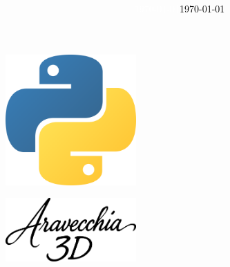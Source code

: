 \documentclass[10pt]{article} %
\date{\small\textcolor{white}\today} %
\title{
	\huge{
		\vspace*{-15mm}
		\resizebox{120mm}{16mm}{\color{black}{\textbf{Python}}} %
	}
}
\begin{document}
	\color{black} %
	\pagecolor{white} %
	\maketitle %
	
	\vspace{-25mm} %
	
	\begin{center}
		\resizebox{120mm}{5mm}{\color{black}{CHEATSHEET}} %
		
		\vspace{10mm}
		\includegraphics[width=50mm]{./IMG/python.png} %
		
		\vspace{10mm}
		\includegraphics[width=50mm]{./IMG/Aravecchia3D.png} %
		
		\date{\small\textcolor{black}\today} %
	\end{center}
	
	\vfil\null\pagebreak %
	
	\normalsize %
	
	
	\begin{multicols}{2}
	\end{multicols}
	
	
\end{document}

